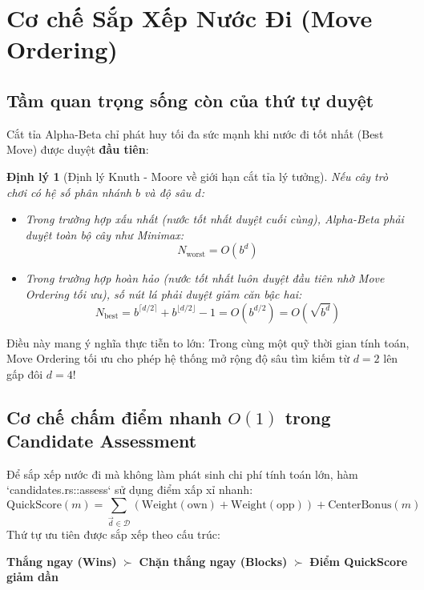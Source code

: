 \documentclass[11pt,a4paper]{report}
\newtheorem{theorem}{Định lý}[chapter]
\begin{document}
\section{Cơ chế Sắp Xếp Nước Đi (Move Ordering)}

\subsection{Tầm quan trọng sống còn của thứ tự duyệt}
Cắt tỉa Alpha-Beta chỉ phát huy tối đa sức mạnh khi nước đi tốt nhất (Best Move) được duyệt \textbf{đầu tiên}:
\begin{theorem}[Định lý Knuth - Moore về giới hạn cắt tỉa lý tưởng]
Nếu cây trò chơi có hệ số phân nhánh $b$ và độ sâu $d$:
\begin{itemize}
    \item Trong trường hợp xấu nhất (nước tốt nhất duyệt cuối cùng), Alpha-Beta phải duyệt toàn bộ cây như Minimax:
    \begin{equation}
        N_{\text{worst}} = O(b^d)
    \end{equation}
    \item Trong trường hợp hoàn hảo (nước tốt nhất luôn duyệt đầu tiên nhờ Move Ordering tối ưu), số nút lá phải duyệt giảm căn bậc hai:
    \begin{equation}
        N_{\text{best}} = b^{\lceil d/2 \rceil} + b^{\lfloor d/2 \rfloor} - 1 = O\left(b^{d/2}\right) = O\left(\sqrt{b^d}\right)
    \end{equation}
\end{itemize}
\end{theorem}

Điều này mang ý nghĩa thực tiễn to lớn: Trong cùng một quỹ thời gian tính toán, Move Ordering tối ưu cho phép hệ thống mở rộng độ sâu tìm kiếm từ $d = 2$ lên gấp đôi $d = 4$!

\subsection{Cơ chế chấm điểm nhanh $O(1)$ trong Candidate Assessment}
Để sắp xếp nước đi mà không làm phát sinh chi phí tính toán lớn, hàm `candidates.rs::assess` sử dụng điểm xấp xỉ nhanh:
\begin{equation}
    \text{QuickScore}(m) = \sum_{\vec{d} \in \mathcal{D}} \left( \text{Weight}(\text{own}) + \text{Weight}(\text{opp}) \right) + \text{CenterBonus}(m)
\end{equation}
Thứ tự ưu tiên được sắp xếp theo cấu trúc:
\begin{center}
\textbf{Thắng ngay (Wins)} $\succ$ \textbf{Chặn thắng ngay (Blocks)} $\succ$ \textbf{Điểm QuickScore giảm dần}
\end{center}
\end{document}
